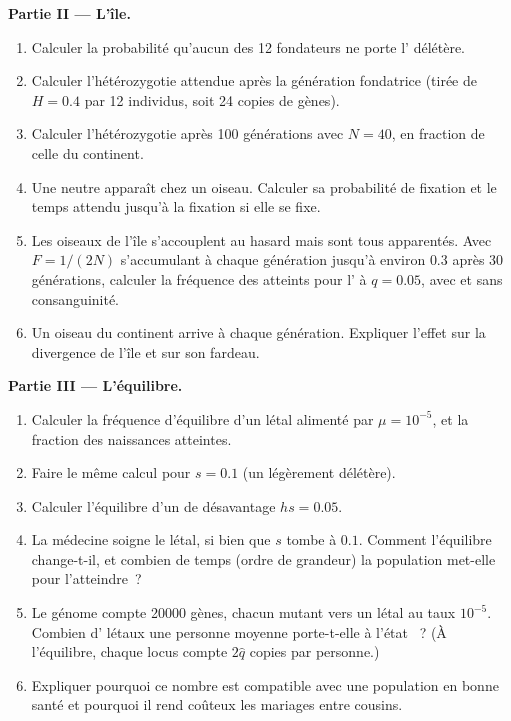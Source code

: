 \begin{problem}
\medskip
\noindent\textbf{Partie II --- L'île.}
\begin{enumerate}[resume]
  \item Calculer la probabilité qu'aucun des 12 fondateurs ne porte
        l' délétère.
  \item Calculer l'hétérozygotie attendue après la génération fondatrice
        (tirée de $H = 0.4$ par 12 individus, soit 24
        copies de gènes).
  \item Calculer l'hétérozygotie après 100 générations avec $N =
        40$, en fraction de celle du continent.
  \item Une  neutre apparaît chez un oiseau. Calculer sa
        probabilité de fixation et le temps attendu jusqu'à la fixation
        si elle se fixe.
  \item Les oiseaux de l'île s'accouplent au hasard mais sont tous
        apparentés. Avec
        $F = 1/(2N)$ s'accumulant à chaque génération jusqu'à environ $0.3$ après
        30 générations, calculer la fréquence des  atteints
        pour l' à $q = 0.05$, avec et sans consanguinité.
  \item Un oiseau du continent arrive à chaque génération. Expliquer
        l'effet sur la divergence de l'île et sur son fardeau.
\end{enumerate}

\medskip
\noindent\textbf{Partie III --- L'équilibre.}
\begin{enumerate}[resume]
  \item Calculer la fréquence d'équilibre d'un  létal alimenté
        par $\mu = 10^{-5}$, et la fraction des naissances atteintes.
  \item Faire le même calcul pour $s = 0.1$ (un  légèrement
        délétère).
  \item Calculer l'équilibre d'un   de désavantage
         $hs = 0.05$.
  \item La médecine soigne le létal, si bien que $s$ tombe à $0.1$.
        Comment l'équilibre change-t-il, et combien de temps (ordre de
        grandeur) la population met-elle pour l'atteindre~?
  \item Le génome compte \num{20000} gènes, chacun mutant vers un
         létal au taux $10^{-5}$. Combien d' létaux une
        personne moyenne porte-t-elle à l'état ~? (À
        l'équilibre, chaque locus compte $2\hat q$ copies par personne.)
  \item Expliquer pourquoi ce nombre est compatible avec une population
        en bonne santé et pourquoi il rend coûteux les mariages entre cousins.
\end{enumerate}


\end{problem}
